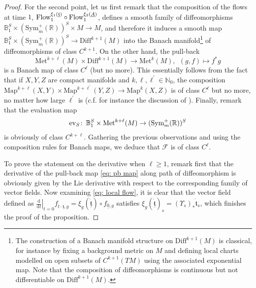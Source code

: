 \documentclass{article}
\numberwithin{equation}{section}        %
\theoremstyle{bfnote}
\theoremstyle{definition}
\theoremstyle{bfremark}
\newcommand{\col}{\colon \thinspace}        %
\newcommand{\N}{\mathbb{N}}                 %
\newcommand{\R}{\mathbb{R}}                 %
\newcommand{\Ball}{\mathbb{B}}              %
\newcommand{\Map}{\mathrm{Map}}             %
\newcommand{\Met}{\mathrm{Met}}             %
\newcommand{\diff}{\mathrm{d}}                      %
\begin{document}
\begin{proof}
    For the second point, let us first remark that the composition of the flows at time $1$, $\textup{Flow}_1^{\xi_1(\underline{\mathfrak{t}})} \circ \textup{Flow}^{\xi_2(\underline{A})}_1$, defines a smooth family of diffeomorphisms $\Ball_1^S \times (\mathrm{Sym}^+_m(\R))^S \times M \to M$, and therefore it induces a smooth map $\Ball_1^S \times (\mathrm{Sym}^+_m(\R))^S \to \mathrm{Diff}^{k+1}(M)$ into the Banach manifold\footnote{The construction of a Banach manifold structure on $\mathrm{Diff}^{k+1}(M)$ is classical, for instance by fixing a background metric on $M$ and defining local charts modelled on open subsets of $C^{k+1}(TM)$ using the associated exponential map. Note that the composition of diffeomorphisms is continuous but not differentiable on $\mathrm{Diff}^{k+1}(M)$.} of diffeomorphisms of class $C^{k+1}$. On the other hand, the pull-back
    \begin{equation}        \label{eq: pb map}
        \Met^{k+\ell}(M) \times \mathrm{Diff}^{k+1}(M) \to \Met^{k}(M), ~~ (g,f) \mapsto f^* g
    \end{equation}
    is a Banach map of class $C^\ell$ (but no more). This essentially follows from the fact that if $X,Y,Z$ are compact manifolds and $k,\ell,\ell^\prime \in \N_0$, the composition $\Map^{k+\ell}(X,Y) \times \Map^{k+\ell^\prime}(Y,Z) \to \Map^{k}(X,Z)$ is of class $C^{\ell}$ but no more, no matter how large $\ell^\prime$ is (c.f. for instance the discussion of \cite[\S5]{eells1981deformations}). Finally, remark that the evaluation map
    \begin{equation*}
        \mathrm{ev}_S \col \Ball_1^S \times \Met^{k+\ell}(M) \to (\mathrm{Sym}^+_m(\R))^S
    \end{equation*}
    is obviously of class $C^{k+\ell}$. Gathering the previous observations and using the composition rules for Banach maps, we deduce that $\mathcal{F}$ is of class $C^\ell$. 

    To prove the statement on the derivative when $\ell \geq 1$, remark first that the derivative of the pull-back map \eqref{eq: pb map} along path of diffeomorphism is obviously given by the Lie derivative with respect to the corresponding family of vector fields. Now examining \eqref{eq: local flow}, it is clear that the vector field defined as $\left. \frac{\diff}{\diff t} \right|_{t = 0} f_{t \cdot \underline{\dot{\mathfrak{t}}},g} = \xi_g(\dot{\underline{\mathfrak{t}}}) \circ f_{\underline{0},g}$ satisfies $\xi_g(\underline{\dot{\mathfrak{t}}})_s = (\Upsilon_s)_* \dot{\mathfrak{t}}_s$, which finishes the proof of the proposition.
\end{proof}
\end{document}
